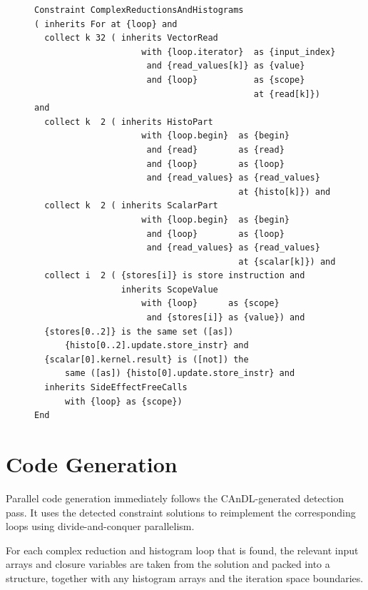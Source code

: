 \begin{figure}[p]
\begin{lstlisting}[language=IDL,label={IDLcomplexred},caption=
   {Complex Reduction and Histogram Computations (CReHCs) as IDL specification:
    The idiom comprises histogram (lines 8--13) and scalar (lines 14--18) reductions contained in a for-loop (line 2).
    These computations reduce the values from the input array (lines 3--7).
    Additional conditions guarantee the absence of any further side-effects in the loop (lines 19--28).}]
Constraint ComplexReductionsAndHistograms
( inherits For at {loop} and
  collect k 32 ( inherits VectorRead
                     with {loop.iterator}  as {input_index}
                      and {read_values[k]} as {value}
                      and {loop}           as {scope}
                                           at {read[k]}) and
  collect k  2 ( inherits HistoPart
                     with {loop.begin}  as {begin}
                      and {read}        as {read}
                      and {loop}        as {loop}
                      and {read_values} as {read_values}
                                        at {histo[k]}) and
  collect k  2 ( inherits ScalarPart
                     with {loop.begin}  as {begin}
                      and {loop}        as {loop}
                      and {read_values} as {read_values}
                                        at {scalar[k]}) and
  collect i  2 ( {stores[i]} is store instruction and
                 inherits ScopeValue
                     with {loop}      as {scope}
                      and {stores[i]} as {value}) and
  {stores[0..2]} is the same set ([as])
      {histo[0..2].update.store_instr} and
  {scalar[0].kernel.result} is ([not]) the
      same ([as]) {histo[0].update.store_instr} and
  inherits SideEffectFreeCalls
      with {loop} as {scope})
End
\end{lstlisting}
\end{figure}

\section{Code Generation}

    Parallel code generation immediately follows the CAnDL-generated detection
    pass.
    It uses the detected constraint solutions to reimplement the corresponding
    loops using divide-and-conquer parallelism.

    For each complex reduction and histogram loop that is found, the relevant
    input arrays and closure variables are taken from the solution and packed
    into a structure, together with any histogram arrays and the iteration
    space boundaries.

